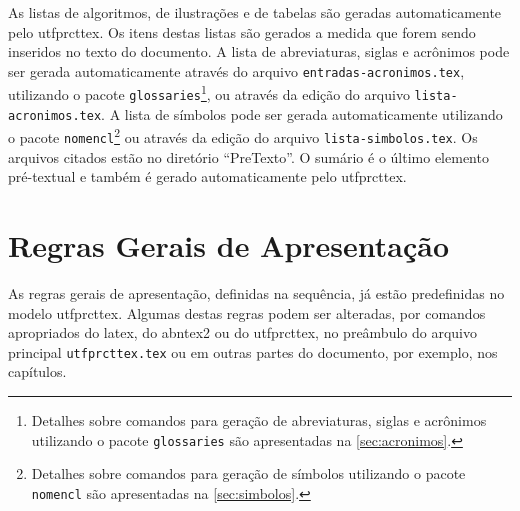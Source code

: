 As listas de algoritmos, de ilustrações e de tabelas são geradas automaticamente pelo \gls{utfprcttex}. Os itens destas listas são gerados a medida que forem sendo inseridos no texto do documento. A lista de abreviaturas, siglas e acrônimos pode ser gerada automaticamente através do arquivo \texttt{entradas-acronimos.tex}, utilizando o pacote \texttt{glossaries}\footnote{Detalhes sobre comandos para geração de abreviaturas, siglas e acrônimos utilizando o pacote \texttt{glossaries} são apresentadas na \autoref{sec:acronimos}.}, ou através da edição do arquivo \texttt{lista-acronimos.tex}. A lista de símbolos pode ser gerada automaticamente utilizando o pacote \texttt{nomencl}\footnote{Detalhes sobre comandos para geração de símbolos utilizando o pacote \texttt{nomencl} são apresentadas na \autoref{sec:simbolos}.} ou através da edição do arquivo \texttt{lista-simbolos.tex}. Os arquivos citados estão no diretório ``PreTexto''. O sumário é o último elemento pré-textual e também é gerado automaticamente pelo \gls{utfprcttex}.

\section{Regras Gerais de Apresentação}\label{sec:regrasgerais}

As regras gerais de apresentação, definidas na sequência, já estão predefinidas no modelo \gls{utfprcttex}. Algumas destas regras podem ser alteradas, por comandos apropriados do \gls{latex}, do \gls{abntex2} ou do \gls{utfprcttex}, no preâmbulo do arquivo principal \texttt{utfprcttex.tex} ou em outras partes do documento, por exemplo, nos capítulos.

